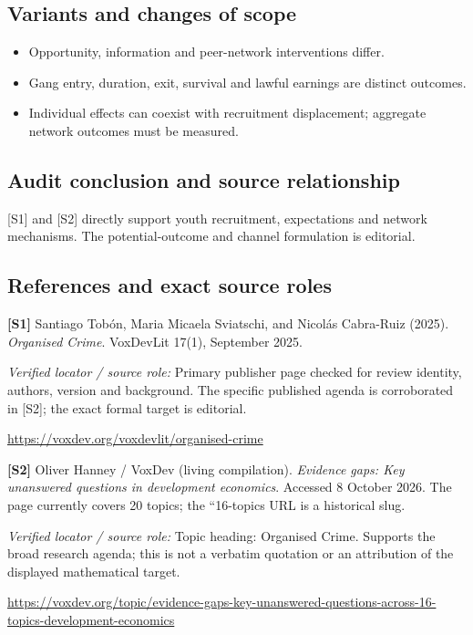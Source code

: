\documentclass[11pt,a4paper]{article}
\begin{document}
\subsection*{Variants and changes of scope}

\begin{itemize}
\item Opportunity, information and peer-network interventions differ.
\item Gang entry, duration, exit, survival and lawful earnings are distinct outcomes.
\item Individual effects can coexist with recruitment displacement; aggregate network outcomes must be measured.
\end{itemize}

\subsection*{Audit conclusion and source relationship}

[S1] and [S2] directly support youth recruitment, expectations and network mechanisms. The potential-outcome and channel formulation is editorial.

\subsection*{References and exact source roles}

{\footnotesize\raggedright
\par\noindent\textbf{[S1]} Santiago Tobón, Maria Micaela Sviatschi, and Nicolás Cabra-Ruiz (2025). \emph{Organised Crime}. VoxDevLit 17(1), September 2025.\par \textit{Verified locator / source role:} Primary publisher page checked for review identity, authors, version and background. The specific published agenda is corroborated in [S2]; the exact formal target is editorial.\par \url{https://voxdev.org/voxdevlit/organised-crime}\par\smallskip
\par\noindent\textbf{[S2]} Oliver Hanney / VoxDev (living compilation). \emph{Evidence gaps: Key unanswered questions in development economics}. Accessed 8 October 2026. The page currently covers 20 topics; the ``16-topics URL is a historical slug.\par \textit{Verified locator / source role:} Topic heading: Organised Crime. Supports the broad research agenda; this is not a verbatim quotation or an attribution of the displayed mathematical target.\par \url{https://voxdev.org/topic/evidence-gaps-key-unanswered-questions-across-16-topics-development-economics}\par\smallskip
}
\end{document}

